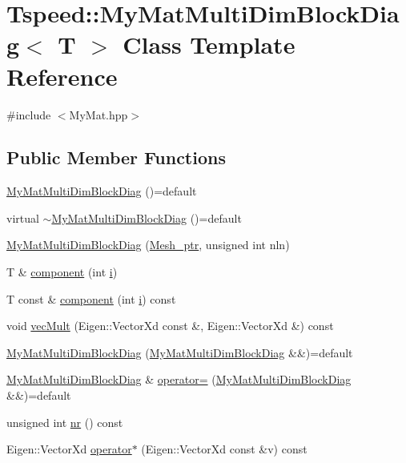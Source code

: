 \hypertarget{classTspeed_1_1MyMatMultiDimBlockDiag}{\section{Tspeed\-:\-:My\-Mat\-Multi\-Dim\-Block\-Diag$<$ T $>$ Class Template Reference}
\label{classTspeed_1_1MyMatMultiDimBlockDiag}
}


{\ttfamily \#include $<$My\-Mat.\-hpp$>$}

\subsection*{Public Member Functions}
\begin{DoxyCompactItemize}
\item 
\hyperlink{classTspeed_1_1MyMatMultiDimBlockDiag_afab5a0f9292e20682a092df2e23e4085}{My\-Mat\-Multi\-Dim\-Block\-Diag} ()=default
\item 
virtual \hyperlink{classTspeed_1_1MyMatMultiDimBlockDiag_a3571b43f213adf9d0a267cb0f51ffa17}{$\sim$\-My\-Mat\-Multi\-Dim\-Block\-Diag} ()=default
\item 
\hyperlink{classTspeed_1_1MyMatMultiDimBlockDiag_aced3b96e49bd12dfeb95f763fbd0757f}{My\-Mat\-Multi\-Dim\-Block\-Diag} (\hyperlink{namespaceTspeed_a7367a01365c4cc2c1a09305b3effc4e8}{Mesh\-\_\-ptr}, unsigned int nln)
\item 
T \& \hyperlink{classTspeed_1_1MyMatMultiDimBlockDiag_aa430ef9d18b0a68c4bff63047daf0be9}{component} (int \hyperlink{vtk__vector__out_8m_a6f6ccfcf58b31cb6412107d9d5281426}{i})
\item 
T const \& \hyperlink{classTspeed_1_1MyMatMultiDimBlockDiag_a5f813a4f7c0a080cb5e1808941ef7348}{component} (int \hyperlink{vtk__vector__out_8m_a6f6ccfcf58b31cb6412107d9d5281426}{i}) const 
\item 
void \hyperlink{classTspeed_1_1MyMatMultiDimBlockDiag_a4d495f30e8088fd75502fa035e719c14}{vec\-Mult} (Eigen\-::\-Vector\-Xd const \&, Eigen\-::\-Vector\-Xd \&) const 
\item 
\hyperlink{classTspeed_1_1MyMatMultiDimBlockDiag_a64aee8deb9a8477c247778c033dd54c0}{My\-Mat\-Multi\-Dim\-Block\-Diag} (\hyperlink{classTspeed_1_1MyMatMultiDimBlockDiag}{My\-Mat\-Multi\-Dim\-Block\-Diag} \&\&)=default
\item 
\hyperlink{classTspeed_1_1MyMatMultiDimBlockDiag}{My\-Mat\-Multi\-Dim\-Block\-Diag} \& \hyperlink{classTspeed_1_1MyMatMultiDimBlockDiag_a2cecd6795a391ecbf1853f8af8926277}{operator=} (\hyperlink{classTspeed_1_1MyMatMultiDimBlockDiag}{My\-Mat\-Multi\-Dim\-Block\-Diag} \&\&)=default
\item 
unsigned int \hyperlink{classTspeed_1_1MyMatMultiDimBlockDiag_a5016da7b2a0ff6099353ddd91f960dd7}{nr} () const 
\item 
Eigen\-::\-Vector\-Xd \hyperlink{classTspeed_1_1MyMatMultiDimBlockDiag_ae688f7b76e7da9686a74bed5d0f059c7}{operator$\ast$} (Eigen\-::\-Vector\-Xd const \&v) const 
\end{DoxyCompactItemize}
